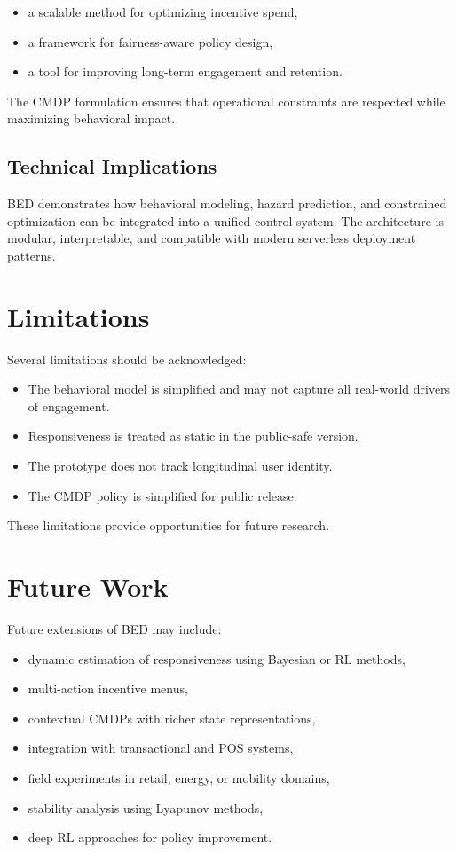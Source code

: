 \begin{itemize}
    \item a scalable method for optimizing incentive spend,
    \item a framework for fairness-aware policy design,
    \item a tool for improving long-term engagement and retention.
\end{itemize}

The CMDP formulation ensures that operational constraints are respected while
maximizing behavioral impact.

\subsection{Technical Implications}
BED demonstrates how behavioral modeling, hazard prediction, and constrained
optimization can be integrated into a unified control system. The architecture
is modular, interpretable, and compatible with modern serverless deployment
patterns.

\section{Limitations}

Several limitations should be acknowledged:

\begin{itemize}
    \item The behavioral model is simplified and may not capture all real-world
    drivers of engagement.
    \item Responsiveness is treated as static in the public-safe version.
    \item The prototype does not track longitudinal user identity.
    \item The CMDP policy is simplified for public release.
\end{itemize}

These limitations provide opportunities for future research.

\section{Future Work}

Future extensions of BED may include:

\begin{itemize}
    \item dynamic estimation of responsiveness using Bayesian or RL methods,
    \item multi-action incentive menus,
    \item contextual CMDPs with richer state representations,
    \item integration with transactional and POS systems,
    \item field experiments in retail, energy, or mobility domains,
    \item stability analysis using Lyapunov methods,
    \item deep RL approaches for policy improvement.
\end{itemize}


